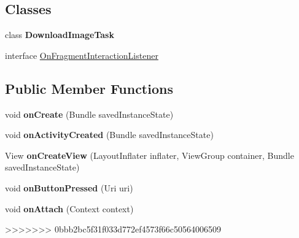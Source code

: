 \begin{DoxyCompactItemize}
\subsection*{\-Classes}
\begin{DoxyCompactItemize}
\item 
class {\bfseries \-Download\-Image\-Task}
\item 
interface \hyperlink{interfacecom_1_1example_1_1sel_1_1lostfound_1_1ProfileFragment_1_1OnFragmentInteractionListener}{\-On\-Fragment\-Interaction\-Listener}
\end{DoxyCompactItemize}
\subsection*{\-Public \-Member \-Functions}
\begin{DoxyCompactItemize}
\item 
\hypertarget{classcom_1_1example_1_1sel_1_1lostfound_1_1ProfileFragment_a52a51c0a57347d86da5de367f715076f}{void {\bfseries on\-Create} (\-Bundle saved\-Instance\-State)}\label{classcom_1_1example_1_1sel_1_1lostfound_1_1ProfileFragment_a52a51c0a57347d86da5de367f715076f}

\item 
\hypertarget{classcom_1_1example_1_1sel_1_1lostfound_1_1ProfileFragment_a1930f4c070b5d7a4204422f4e0ddc35f}{void {\bfseries on\-Activity\-Created} (\-Bundle saved\-Instance\-State)}\label{classcom_1_1example_1_1sel_1_1lostfound_1_1ProfileFragment_a1930f4c070b5d7a4204422f4e0ddc35f}

\item 
\hypertarget{classcom_1_1example_1_1sel_1_1lostfound_1_1ProfileFragment_a7bb29240ea89cc1f9c5539dd9117765e}{\-View {\bfseries on\-Create\-View} (\-Layout\-Inflater inflater, \-View\-Group container, \-Bundle saved\-Instance\-State)}\label{classcom_1_1example_1_1sel_1_1lostfound_1_1ProfileFragment_a7bb29240ea89cc1f9c5539dd9117765e}

\item 
\hypertarget{classcom_1_1example_1_1sel_1_1lostfound_1_1ProfileFragment_a5d06af34470ca3d940361d9315cd98fb}{void {\bfseries on\-Button\-Pressed} (\-Uri uri)}\label{classcom_1_1example_1_1sel_1_1lostfound_1_1ProfileFragment_a5d06af34470ca3d940361d9315cd98fb}

\item 
\hypertarget{classcom_1_1example_1_1sel_1_1lostfound_1_1ProfileFragment_a22ef41a710d02636086eb5b6b01a2e1e}{void {\bfseries on\-Attach} (\-Context context)}\label{classcom_1_1example_1_1sel_1_1lostfound_1_1ProfileFragment_a22ef41a710d02636086eb5b6b01a2e1e}
>>>>>>> 0bbb2bc5f31f033d772ef4573f66c50564006509


\end{DoxyCompactItemize}
\end{DoxyCompactItemize}
